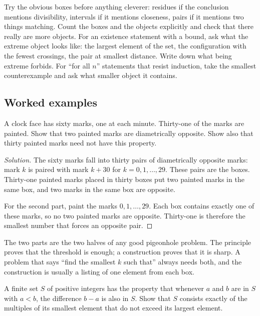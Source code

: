 \begin{firstmoves}
Try the obvious boxes before anything cleverer: residues if the conclusion mentions divisibility, intervals if it mentions closeness, pairs if it mentions two things matching. Count the boxes and the objects explicitly and check that there really are more objects. For an existence statement with a bound, ask what the extreme object looks like: the largest element of the set, the configuration with the fewest crossings, the pair at smallest distance. Write down what being extreme forbids. For ``for all $n$'' statements that resist induction, take the smallest counterexample and ask what smaller object it contains.
\end{firstmoves}

\subsection*{Worked examples}

\begin{example}
A clock face has sixty marks, one at each minute. Thirty-one of the marks are painted. Show that two painted marks are diametrically opposite. Show also that thirty painted marks need not have this property.
\end{example}

\begin{proof}[Solution]
The sixty marks fall into thirty pairs of diametrically opposite marks: mark $k$ is paired with mark $k + 30$ for $k = 0, 1, \dots, 29$. These pairs are the boxes. Thirty-one painted marks placed in thirty boxes put two painted marks in the same box, and two marks in the same box are opposite.

For the second part, paint the marks $0, 1, \dots, 29$. Each box contains exactly one of these marks, so no two painted marks are opposite. Thirty-one is therefore the smallest number that forces an opposite pair.
\end{proof}

The two parts are the two halves of any good pigeonhole problem. The principle proves that the threshold is enough; a construction proves that it is sharp. A problem that says ``find the smallest $k$ such that'' always needs both, and the construction is usually a listing of one element from each box.

\begin{example}
A finite set $S$ of positive integers has the property that whenever $a$ and $b$ are in $S$ with $a < b$, the difference $b - a$ is also in $S$. Show that $S$ consists exactly of the multiples of its smallest element that do not exceed its largest element.
\end{example}

